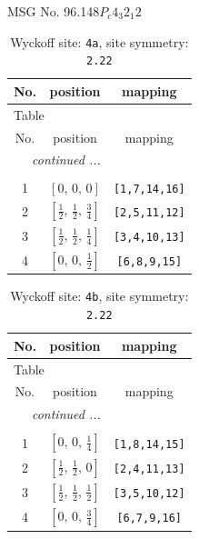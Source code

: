\documentclass[fleqn,8pt]{jsarticle}
\begin{document}
\setcounter{MaxMatrixCols}{32}

\renewcommand{\tablename}{Table~}
\renewcommand{\figurename}{Figure~}
\begin{center}
\LARGE
MSG No. 96.148\quad$P_{c}4_{3}2_{1}2$
\end{center}
\renewcommand{\arraystretch}{1.2}
\begin{longtable}{ccc}
\caption{Wyckoff site: {\tt 4a}, site symmetry: {\tt 2.22}}
 \\
 \hline \hline
No. & position & mapping \\ \hline \endfirsthead

\multicolumn{2}{l}{\tablename\ \thetable{}} \\
 \hline \hline
No. & position & mapping \\ \hline \endhead

 \hline \hline
\multicolumn{2}{r}{\footnotesize\it continued ...} \\ \endfoot

 \hline \hline
\multicolumn{2}{r}{} \\ \endlastfoot

1 & $\left[ 0,\, 0,\, 0 \right]$ & {\tt [1,7,14,16]} \\ \hline
2 & $\left[ \frac{1}{2},\, \frac{1}{2},\, \frac{3}{4} \right]$ & {\tt [2,5,11,12]} \\ \hline
3 & $\left[ \frac{1}{2},\, \frac{1}{2},\, \frac{1}{4} \right]$ & {\tt [3,4,10,13]} \\ \hline
4 & $\left[ 0,\, 0,\, \frac{1}{2} \right]$ & {\tt [6,8,9,15]} \\
\end{longtable}
\renewcommand{\arraystretch}{1.2}
\begin{longtable}{ccc}
\caption{Wyckoff site: {\tt 4b}, site symmetry: {\tt 2.22}}
 \\
 \hline \hline
No. & position & mapping \\ \hline \endfirsthead

\multicolumn{2}{l}{\tablename\ \thetable{}} \\
 \hline \hline
No. & position & mapping \\ \hline \endhead

 \hline \hline
\multicolumn{2}{r}{\footnotesize\it continued ...} \\ \endfoot

 \hline \hline
\multicolumn{2}{r}{} \\ \endlastfoot

1 & $\left[ 0,\, 0,\, \frac{1}{4} \right]$ & {\tt [1,8,14,15]} \\ \hline
2 & $\left[ \frac{1}{2},\, \frac{1}{2},\, 0 \right]$ & {\tt [2,4,11,13]} \\ \hline
3 & $\left[ \frac{1}{2},\, \frac{1}{2},\, \frac{1}{2} \right]$ & {\tt [3,5,10,12]} \\ \hline
4 & $\left[ 0,\, 0,\, \frac{3}{4} \right]$ & {\tt [6,7,9,16]} \\
\end{longtable}
\end{document}
